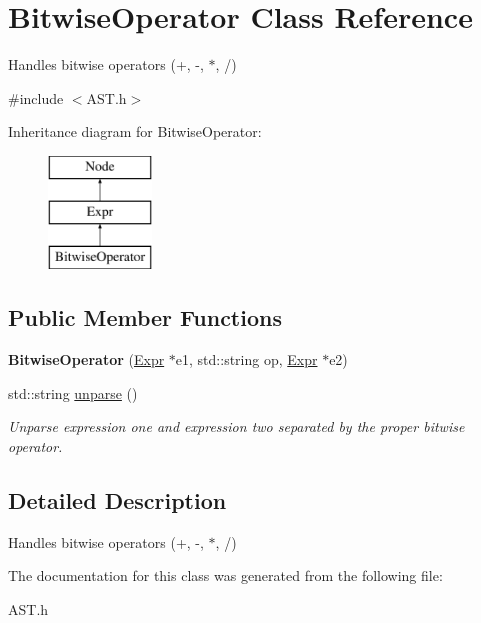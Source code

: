 \hypertarget{classBitwiseOperator}{\section{Bitwise\-Operator Class Reference}
\label{classBitwiseOperator}
}


Handles bitwise operators (+, -\/, $\ast$, /)  




{\ttfamily \#include $<$A\-S\-T.\-h$>$}

Inheritance diagram for Bitwise\-Operator\-:\begin{figure}[H]
\begin{center}
\leavevmode
\includegraphics[height=3.000000cm]{classBitwiseOperator}
\end{center}
\end{figure}
\subsection*{Public Member Functions}
\begin{DoxyCompactItemize}
\item 
\hypertarget{classBitwiseOperator_ab8e77f532c44d54982359db0a5a549d2}{{\bfseries Bitwise\-Operator} (\hyperlink{classExpr}{Expr} $\ast$e1, std\-::string op, \hyperlink{classExpr}{Expr} $\ast$e2)}\label{classBitwiseOperator_ab8e77f532c44d54982359db0a5a549d2}

\item 
\hypertarget{classBitwiseOperator_aab4c8032951100835bdcebf08e924e5e}{std\-::string \hyperlink{classBitwiseOperator_aab4c8032951100835bdcebf08e924e5e}{unparse} ()}\label{classBitwiseOperator_aab4c8032951100835bdcebf08e924e5e}

\begin{DoxyCompactList}\small\item\em Unparse expression one and expression two separated by the proper bitwise operator. \end{DoxyCompactList}\end{DoxyCompactItemize}


\subsection{Detailed Description}
Handles bitwise operators (+, -\/, $\ast$, /) 

The documentation for this class was generated from the following file\-:\begin{DoxyCompactItemize}
\item 
A\-S\-T.\-h\end{DoxyCompactItemize}
